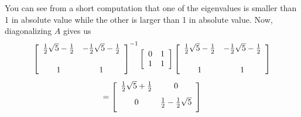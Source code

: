\begin{solution}
You can see from a short computation that one of the eigenvalues is smaller than 1 in
absolute value while the other is larger than 1 in absolute value.
Now, diagonalizing $A$ gives us 
\begin{equation*}
\leftB
\begin{array}{cc}
\vspace{0.05in}\frac{1}{2}\sqrt{5}-\vspace{0.05in}\frac{1}{2} & -\vspace{0.05in}\frac{1}{2}\sqrt{5}-\vspace{0.05in}\frac{1}{2} \\
1 & 1
\end{array}
\rightB ^{-1}\leftB
\begin{array}{rr}
0 & 1 \\
1 & 1
\end{array}
\rightB \leftB
\begin{array}{cc}
\vspace{0.05in}\frac{1}{2}\sqrt{5}-\vspace{0.05in}\frac{1}{2} & -\vspace{0.05in}\frac{1}{2}\sqrt{5}-\vspace{0.05in}\frac{1}{2} \\
1 & 1
\end{array}
\rightB
\end{equation*}
\begin{equation*}
=\leftB
\begin{array}{cc}
\vspace{0.05in}\frac{1}{2}\sqrt{5}+\vspace{0.05in}\frac{1}{2} & 0 \\
0 & \vspace{0.05in}\frac{1}{2}-\vspace{0.05in}\frac{1}{2}\sqrt{5}
\end{array}
\rightB 
\end{equation*}


\end{solution}
